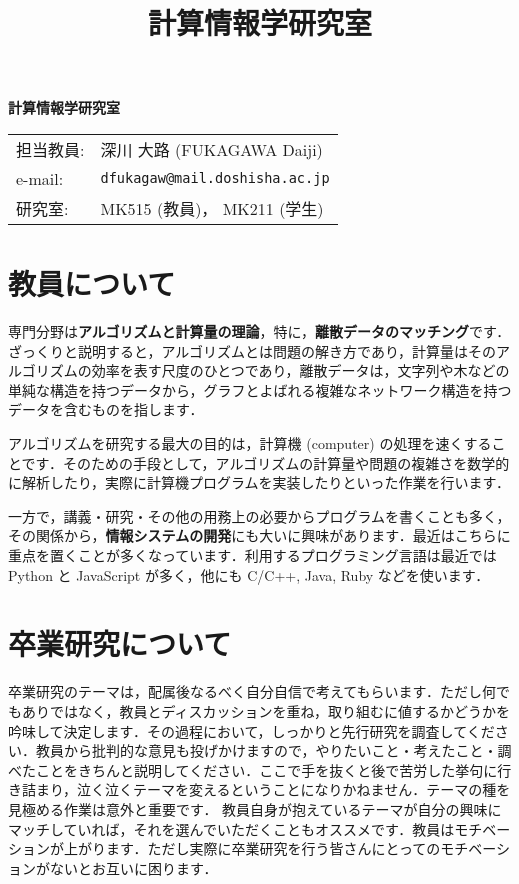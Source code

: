 \documentclass[a4paper,uplatex,dvipdfm]{bxjsarticle}
\title{計算情報学研究室}
\date{}
\begin{document}
\begin{minipage}[t]{.45\textwidth}
\noindent
{\Huge\bfseries\rmfamily 計算情報学研究室}
\end{minipage}
\begin{minipage}[t]{.50\textwidth}
\begin{tabular}{ll}
担当教員: & 深川 大路 (FUKAGAWA Daiji) \\
e-mail: & \texttt{dfukagaw@mail.doshisha.ac.jp} \\
研究室: & MK515 (教員)， MK211 (学生)
\end{tabular}
\end{minipage}


\section{教員について}

専門分野は{\sffamily\bfseries アルゴリズムと計算量の理論}，特に，{\sffamily\bfseries 離散データのマッチング}です．
ざっくりと説明すると，アルゴリズムとは問題の解き方であり，計算量はそのアルゴリズムの効率を表す尺度のひとつであり，離散データは，文字列や木などの単純な構造を持つデータから，グラフとよばれる複雑なネットワーク構造を持つデータを含むものを指します．

アルゴリズムを研究する最大の目的は，計算機 (computer) の処理を速くすることです．そのための手段として，アルゴリズムの計算量や問題の複雑さを数学的に解析したり，実際に計算機プログラムを実装したりといった作業を行います．

一方で，講義・研究・その他の用務上の必要からプログラムを書くことも多く，その関係から，{\sffamily\bfseries 情報システムの開発}にも大いに興味があります．最近はこちらに重点を置くことが多くなっています．利用するプログラミング言語は最近では Python と JavaScript が多く，他にも C/C++, Java, Ruby などを使います．

\section{卒業研究について}

卒業研究のテーマは，配属後なるべく自分自信で考えてもらいます．ただし何でもありではなく，教員とディスカッションを重ね，取り組むに値するかどうかを吟味して決定します．その過程において，しっかりと先行研究を調査してください．教員から批判的な意見も投げかけますので，やりたいこと・考えたこと・調べたことをきちんと説明してください．ここで手を抜くと後で苦労した挙句に行き詰まり，泣く泣くテーマを変えるということになりかねません．テーマの種を見極める作業は意外と重要です．
教員自身が抱えているテーマが自分の興味にマッチしていれば，それを選んでいただくこともオススメです．教員はモチベーションが上がります．ただし実際に卒業研究を行う皆さんにとってのモチベーションがないとお互いに困ります．
\end{document}
